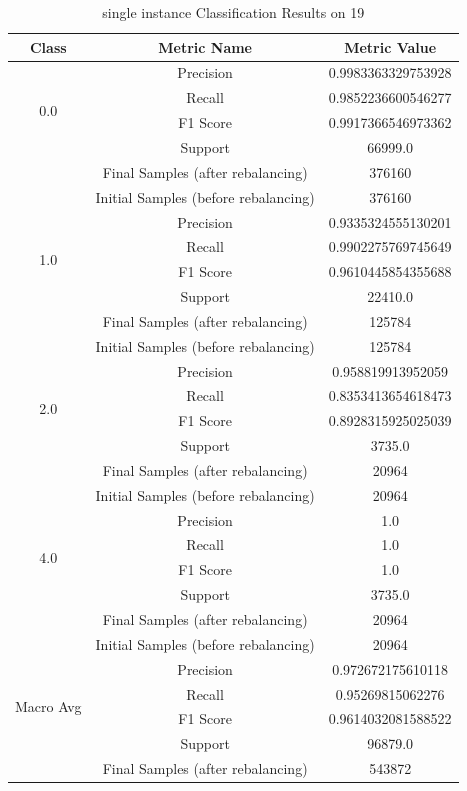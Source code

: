 \begin{longtable}{|c|c|c|}
\caption{single instance Classification Results on 19} \label{tab:19_single_instance_classifiers_results} \\
\hline
Class & Metric Name & Metric Value \\
\hline
\multirow{4}{*}{0.0} & Precision & 0.9983363329753928 \\
 & Recall & 0.9852236600546277 \\
 & F1 Score & 0.9917366546973362 \\
 & Support & 66999.0 \\
 & Final Samples (after rebalancing) & 376160 \\
 & Initial Samples (before rebalancing) & 376160 \\
\hline
\multirow{4}{*}{1.0} & Precision & 0.9335324555130201 \\
 & Recall & 0.9902275769745649 \\
 & F1 Score & 0.9610445854355688 \\
 & Support & 22410.0 \\
 & Final Samples (after rebalancing) & 125784 \\
 & Initial Samples (before rebalancing) & 125784 \\
\hline
\multirow{4}{*}{2.0} & Precision & 0.958819913952059 \\
 & Recall & 0.8353413654618473 \\
 & F1 Score & 0.8928315925025039 \\
 & Support & 3735.0 \\
 & Final Samples (after rebalancing) & 20964 \\
 & Initial Samples (before rebalancing) & 20964 \\
\hline
\multirow{4}{*}{4.0} & Precision & 1.0 \\
 & Recall & 1.0 \\
 & F1 Score & 1.0 \\
 & Support & 3735.0 \\
 & Final Samples (after rebalancing) & 20964 \\
 & Initial Samples (before rebalancing) & 20964 \\
\hline
\multirow{4}{*}{Macro Avg} & Precision & 0.972672175610118 \\
 & Recall & 0.95269815062276 \\
 & F1 Score & 0.9614032081588522 \\
 & Support & 96879.0 \\
 & Final Samples (after rebalancing) & 543872 \\

\end{longtable}
